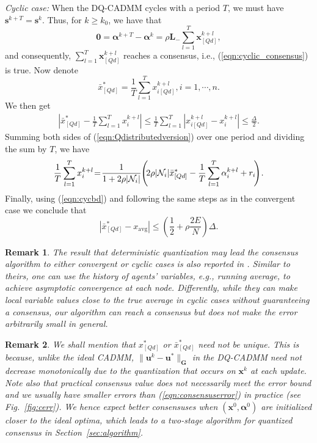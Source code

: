 \documentclass[journal]{IEEEtran}
\newtheorem{remark}{Remark}
\begin{document}
\begin{IEEEproof}
\emph{Cyclic case:} When the DQ-CADMM cycles with a period $T$, we must have $\bm s^{k+T}=\bm s^k$. Thus, for $k\geq k_0$, we have that 
$$\bm 0 = \bm\alpha^{k+T}-\bm\alpha^k = \rho\bm L_-\sum_{l=1}^{T}\bm x^{k+l}_{[Qd]},$$
and consequently, $\sum_{l=1}^{T}\bm x^{k+l}_{[Qd]}$ reaches a consensus, i.e., (\ref{eqn:cyclic_consensus}) is true. Now denote $$\bar{x}^*_{[Qd]} = \frac{1}{T}\sum_{l=1}^{T}x^{k+l}_{i[Qd]}, i=1,\cdots, n.$$ We then get
\begin{align}
\label{eqn:cycbd}\left|\bar{x}_{[Qd]}^*-\frac{1}{T}\sum_{l=1}^{T}x^{k+l}_{i}\right|\leq \frac{1}{T}\sum_{l=1}^T\left|x^{k+l}_{i[Qd]}-x^{k+l}_i\right|\leq\frac{\Delta}{2}.
\end{align}
Summing both sides of (\ref{eqn:Qdistributedversion}) over one period and dividing the sum by $T$, we have 
$$\frac{1}{T}\sum_{l=1}^T x_i^{k+l}\hspace{-2pt}=\hspace{-2pt}\frac{1}{1+2\rho|\mathcal{N}_i|}\hspace{-2pt}\left(\hspace{-2pt}2\rho|\mathcal{N}_i|\bar{x}^*_{[Qd]}-\frac{1}{T}\sum_{l=1}^T\alpha_i^{k+l}+r_i\hspace{-2pt}\right)\hspace{-1pt}.$$
Finally, using (\ref{eqn:cycbd}) and following the same steps as in the convergent case we conclude that 
$$\left|\bar{x}^*_{[Qd]}-x_\text{avg}\right|\leq \left(\frac{1}{2}+\rho\frac{2E}{N}\right)\Delta.$$
\end{IEEEproof}
\begin{remark}
The result that deterministic quantization may lead the consensus algorithm to either convergent or cyclic cases is also reported in \cite{Chamie2014}. Similar to theirs, one can use the history of agents' variables, e.g., running average, to achieve asymptotic convergence at each node. Differently, while they can make local variable values close to the true average in cyclic cases without guaranteeing  a consensus, our algorithm can reach a consensus but does not make the error arbitrarily small in general. 
\end{remark}
\begin{remark}
\label{rmk:notglobal}
We shall mention that $x^*_{[Qd]}$ or $\bar{x}^*_{[Qd]}$ need not be unique. This is because, unlike the ideal CADMM, $\|\bm u^k - \bm u^*\|_{\bm G}$ in the DQ-CADMM need not decrease monotonically due to the quantization {\em that occurs on $\bm x^k$ at each update}. Note also that practical consensus value does not necessarily meet the error bound and we usually have smaller errors than (\ref{eqn:consensuserror}) in practice (see Fig.~\ref{fig:cerr}). We hence expect better consensuses when $(\bm x^0,\bm\alpha^0)$ are initialized closer to the ideal optima, which leads to a two-stage algorithm for quantized consensus in Section~\ref{sec:algorithm}.
\end{remark}
\end{document}
